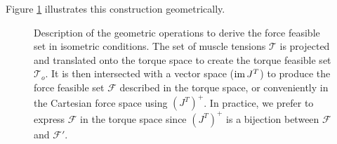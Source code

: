 Figure \ref{fig:formula_} illustrates this construction geometrically.
\begin{figure}[!ht]
  \centering
  \captionsetup{justification=centering}
  \caption{Description of the geometric operations to derive the force feasible set in isometric conditions. The set of muscle tensions $\mathcal{T}$ is projected and translated onto the torque space to create the torque feasible set $\mathcal{T}_o$. It is then intersected with a vector space ($\operatorname{im} J^T$) to produce the force feasible set $\mathcal{F}$ described in the torque space, or conveniently in the Cartesian force space using $(J^T)^+$. In practice, we prefer to express $\mathcal{F}$ in the torque space since $(J^T)^+$ is a bijection between $\mathcal{F}$ and $\mathcal{F}'$.}
  \label{fig:formula_}
\end{figure}

